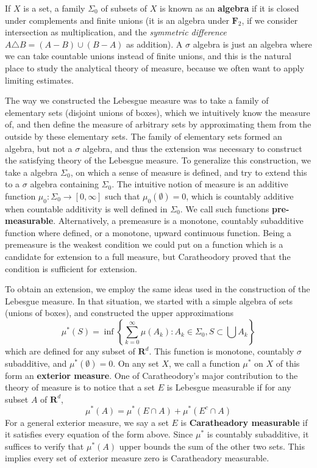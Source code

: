 If $X$ is a set, a family $\Sigma_0$ of subsets of $X$ is known as an {\bf algebra} if it is closed under complements and finite unions (it is an algebra under $\mathbf{F}_2$, if we consider intersection as multiplication, and the {\it symmetric difference} $A \triangle B = (A - B) \cup (B - A)$ as addition). A $\sigma$ algebra is just an algebra where we can take countable unions instead of finite unions, and this is the natural place to study the analytical theory of measure, because we often want to apply limiting estimates.

The way we constructed the Lebesgue measure was to take a family of elementary sets (disjoint unions of boxes), which we intuitively know the measure of, and then define the measure of arbitrary sets by approximating them from the outside by these elementary sets. The family of elementary sets formed an algebra, but not a $\sigma$ algebra, and thus the extension was necessary to construct the satisfying theory of the Lebesgue measure. To generalize this construction, we take a algebra $\Sigma_0$, on which a sense of measure is defined, and try to extend this to a $\sigma$ algebra containing $\Sigma_0$. The intuitive notion of measure is an additive function $\mu_0: \Sigma_0 \to [0,\infty]$  such that $\mu_0(\emptyset) = 0$, which is countably additive when countable additivity is well defined in $\Sigma_0$. We call such functions {\bf pre-measurable}. Alternatively, a premeasure is a monotone, countably subadditive function where defined, or a monotone, upward continuous function. Being a premeasure is the weakest condition we could put on a function which is a candidate for extension to a full measure, but Caratheodory proved that the condition is sufficient for extension.

To obtain an extension, we employ the same ideas used in the construction of the Lebesgue measure. In that situation, we started with a simple algebra of sets (unions of boxes), and constructed the upper approximations
%
\[ \mu^*(S) = \inf \left\{ \sum_{k = 0}^\infty \mu(A_k) : A_k \in \Sigma_0, S \subset \bigcup A_k \right\} \]
%
which are defined for any subset of $\mathbf{R}^d$. This function is monotone, countably $\sigma$ subadditive, and $\mu^*(\emptyset) = 0$. On any set $X$, we call a function $\mu^*$ on $X$ of this form an {\bf exterior measure}. One of Caratheodory's major contribution to the theory of measure is to notice that a set $E$ is Lebesgue measurable if for any subset $A$ of $\mathbf{R}^d$,
%
\[ \mu^*(A) = \mu^*(E \cap A) + \mu^*(E^c \cap A) \]
%
For a general exterior measure, we say a set $E$ is {\bf Caratheadory measurable} if it satisfies every equation of the form above. Since $\mu^*$ is countably subadditive, it suffices to verify that $\mu^*(A)$ upper bounds the sum of the other two sets. This implies every set of exterior measure zero is Caratheadory measurable.

